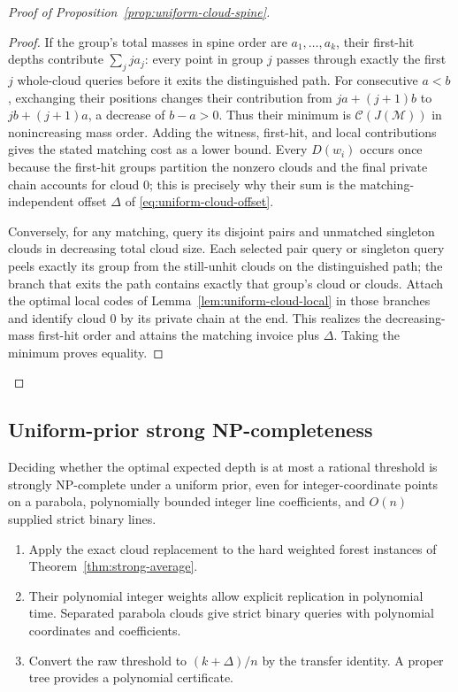\begin{proof}[Proof of Proposition~\ref{prop:uniform-cloud-spine}]
\begin{proof}
If the group's total masses in spine order are $a_1,\ldots,a_k$,
their first-hit depths contribute $\sum_j j a_j$: every point in
group $j$ passes through exactly the first $j$ whole-cloud queries
before it exits the distinguished path. For consecutive
$a<b$, exchanging their positions changes their contribution from
$ja+(j+1)b$ to $jb+(j+1)a$, a decrease of $b-a>0$.
Thus their minimum is $\mathcal C(J(\mathcal M))$ in nonincreasing
mass order. Adding the witness, first-hit, and local contributions
gives the stated matching cost as a lower bound. Every
$D(w_i)$ occurs once because the first-hit groups partition the
nonzero clouds and the final private chain accounts for cloud $0$;
this is precisely why their sum is the matching-independent offset
$\Delta$ of \eqref{eq:uniform-cloud-offset}.

Conversely, for any matching, query its disjoint pairs and
unmatched singleton clouds in decreasing total cloud size.
Each selected pair query or singleton query peels exactly its group
from the still-unhit clouds on the distinguished path; the branch
that exits the path contains exactly that group's cloud or clouds.
Attach the
optimal local codes of Lemma~\ref{lem:uniform-cloud-local} in those
branches and identify cloud $0$ by its private chain at the end. This
realizes the decreasing-mass first-hit order and attains the matching
invoice plus $\Delta$. Taking the minimum proves equality.
\end{proof}
\end{proof}

\subsection{Uniform-prior strong NP-completeness}

\begin{theorem}
\label{thm:strong-uniform-average}
Deciding whether the optimal expected depth is at most a rational
threshold is strongly NP-complete under a uniform prior, even for
integer-coordinate points on a parabola, polynomially bounded
integer line coefficients, and $O(n)$ supplied strict binary lines.
\end{theorem}

\begin{proofstrategy}
\begin{enumerate}
\item Apply the exact cloud replacement to the hard weighted forest
instances of Theorem~\ref{thm:strong-average}.
\item Their polynomial integer weights allow explicit replication in
polynomial time. Separated parabola clouds give strict binary queries
with polynomial coordinates and coefficients.
\item Convert the raw threshold to $(k+\Delta)/n$ by the transfer
identity. A proper tree provides a polynomial certificate.
\end{enumerate}
\end{proofstrategy}

